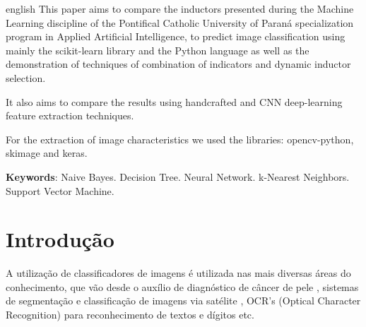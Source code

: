 \documentclass[
article,			%
11pt,				%
oneside,			%
a4paper,			%
english,			%
brazil,				%
sumario=tradicional,
]{abntex2}
\begin{document}
	
	\renewcommand{\resumoname}{Abstract}
	\begin{resumoumacoluna}
		\begin{otherlanguage*}{english}
			This paper aims to compare the inductors presented during the Machine Learning discipline of the Pontifical Catholic University of Paraná specialization program in Applied Artificial Intelligence, to predict image classification using mainly the scikit-learn library and the Python language as well as the demonstration of techniques of combination of indicators and dynamic inductor selection.
			
			It also aims to compare the results using handcrafted and CNN deep-learning feature extraction techniques.
			
			For the extraction of image characteristics we used the libraries: opencv-python, skimage and keras.
			\vspace{\onelineskip}
			
			\noindent
			\textbf{Keywords}: Naive Bayes. Decision Tree. Neural Network. k-Nearest Neighbors. Support Vector Machine.
		\end{otherlanguage*}  
	\end{resumoumacoluna}
	
	
	
		
	
	\textual
	
	\section{Introdução}
	
	A utilização de classificadores de imagens é utilizada nas mais diversas áreas do conhecimento,  que vão desde o auxílio de diagnóstico de câncer de pele  , sistemas de segmentação e classificação de imagens via satélite , OCR's (Optical Character Recognition) para reconhecimento de textos e dígitos  etc.
	
\end{document}
